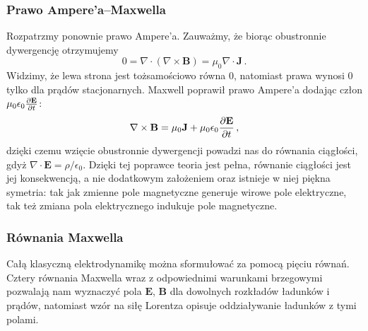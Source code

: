 \documentclass[../main.tex]{subfiles}
\begin{document}
\subsubsection{Prawo Ampere'a--Maxwella}
Rozpatrzmy ponownie prawo Ampere'a. Zauważmy, że biorąc obustronnie dywergencję otrzymujemy
\begin{equation*}
    0=\nabla\cdot(\nabla\times\mathbf{B})=\mu_0\nabla\cdot\mathbf{J}\,.
\end{equation*}
Widzimy, że lewa strona jest tożsamościowo równa 0, natomiast prawa wynosi 0 tylko dla prądów stacjonarnych. Maxwell poprawił prawo Ampere'a dodając człon \(\mu_0\epsilon_0\pdv{\mathbf{E}}{t}\):
\begin{equation*}
    \nabla\times\mathbf{B}=\mu_0\mathbf{J}+\mu_0\epsilon_0\pdv{\mathbf{E}}{t}\,,
\end{equation*}
dzięki czemu wzięcie obustronnie dywergencji powadzi nas do równania ciągłości, gdyż \(\nabla\cdot\mathbf{E}=\rho/\epsilon_0\). Dzięki tej poprawce teoria jest pełna, równanie ciągłości jest jej konsekwencją, a nie dodatkowym założeniem oraz istnieje w niej piękna symetria: tak jak zmienne pole magnetyczne generuje wirowe pole elektryczne, tak też zmiana pola elektrycznego indukuje pole magnetyczne. 
\subsubsection{Równania Maxwella}
Całą klasyczną elektrodynamikę można sformułować za pomocą pięciu równań. Cztery równania Maxwella wraz z odpowiednimi warunkami brzegowymi pozwalają nam wyznaczyć pola \(\mathbf{E}\), \(\mathbf{B}\) dla dowolnych rozkładów ładunków i prądów, natomiast wzór na siłę Lorentza opisuje oddziaływanie ładunków z tymi polami.
\medskip

\noindent{}
\medskip
\end{document}
